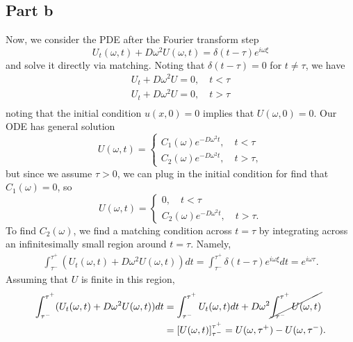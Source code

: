 \documentclass{article}
\begin{document}
\subsection{Part b}
Now, we consider the PDE after the Fourier transform step 
\[
U_t(\omega,t)+D\omega^2U(\omega,t)=\delta(t-\tau)e^{i\omega \xi}
\]
and solve it directly via %
matching. Noting that $\delta(t-\tau)=0$ for $t\neq\tau$, we have 
\begin{align*}
U_t+D\omega^2U=0, \quad t<\tau\\
U_t+D\omega^2U=0,\quad t>\tau\\
\end{align*}
noting that the initial condition $u(x,0)=0$ implies that $U(\omega,0)=0$. Our ODE has general solution
\[
U(\omega,t)=\begin{cases}
C_1(\omega)e^{-D\omega^2t},\quad t<\tau\\
C_2(\omega)e^{-D\omega^2t},\quad t>\tau,
\end{cases}
\]
but since we assume $\tau>0$, we can plug in the initial condition for find that $C_1(\omega)=0$, so
\[
U(\omega,t)=\begin{cases}
	0,\quad t<\tau\\
	C_2(\omega)e^{-D\omega^2t},\quad t>\tau.
\end{cases}
\]
To find $C_2(\omega)$, we find a matching condition across $t=\tau$ by integrating across an infinitesimally small region around $t=\tau$. Namely,
\begin{align*}
\int_{\tau^-}^{\tau^+}(U_t(\omega,t)+D\omega^2U(\omega,t))dt=\int_{\tau^-}^{\tau^+}\delta(t-\tau)e^{i\omega \xi}dt=e^{i\omega\tau}.
\end{align*}
Assuming that $U$ is finite in this region, 
\begin{align*}
\int_{\tau^-}^{\tau^+}(U_t(\omega,t)+D\omega^2U(\omega,t))dt&=\int_{\tau^-}^{\tau^+}U_t(\omega,t)dt+D\omega^2\cancel{\int_{\tau^-}^{\tau^+}U(\omega,t)}\\&=
\left[U(\omega,t)\right]_{\tau^-}^{\tau^+}=U(\omega,\tau^+)-U(\omega,\tau^-).
\end{align*}
\end{document}
